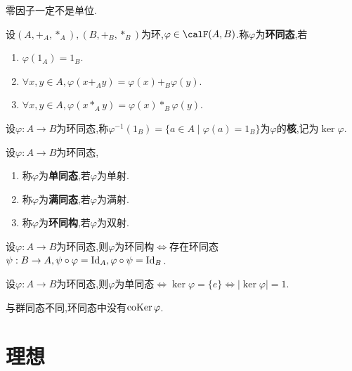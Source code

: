 \begin{prop}
    零因子一定不是单位.
\end{prop}

\begin{deff}
    设$(A, +_A, *_A), (B, +_B, *_B)$为环,$\varphi \in \calF(A, B)$.称$\varphi$为\textbf{环同态},若
    \begin{enumerate}
        \item $\varphi(1_A) = 1_B$.
        \item $\forall x, y \in A, \varphi(x +_A y) = \varphi(x) +_B \varphi(y)$.
        \item $\forall x, y \in A, \varphi(x *_A y) = \varphi(x) *_B \varphi(y)$.
    \end{enumerate}
\end{deff}

\begin{deff}
    设$\varphi: A \to B$为环同态,称$\varphi^{-1}(1_B) = \{ a \in A \mid \varphi(a) = 1_B \}$为$\varphi$的\textbf{核},记为$\ker \varphi$.
\end{deff}

\begin{deff}
    设$\varphi: A \to B$为环同态,
    \begin{enumerate}
        \item 称$\varphi$为\textbf{单同态},若$\varphi$为单射.
        \item 称$\varphi$为\textbf{满同态},若$\varphi$为满射.
        \item 称$\varphi$为\textbf{环同构},若$\varphi$为双射.
    \end{enumerate}
\end{deff}

\begin{prop}
    设$\varphi: A \to B$为环同态,则$\varphi$为环同构$\iff$存在环同态$\psi: B \to A, \psi \circ \varphi = \operatorname{Id}_A, \varphi \circ \psi = \operatorname{Id}_B$.
\end{prop}

\begin{prop}
    设$\varphi: A \to B$为环同态,则$\varphi$为单同态$\iff \ker \varphi = \{ e \} \iff \lvert \ker \varphi \rvert = 1$.
\end{prop}

\begin{rqq}
    与群同态不同,环同态中没有$\operatorname{coKer} \varphi$.
\end{rqq}

\section{理想}

